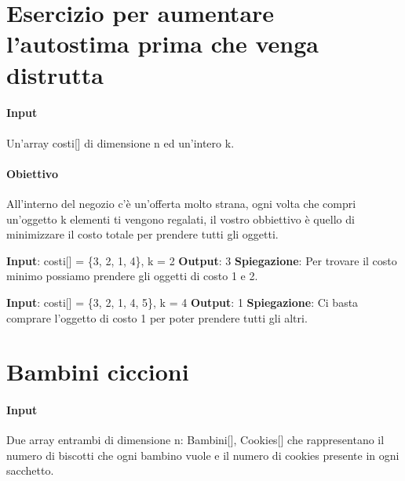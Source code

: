\setlength{\parskip}{0pt}
\titlespacing*{\subparagraph}{1em}{0em}{0em} 


\thispagestyle{chapterInit}
\section*{Esercizio per aumentare l'autostima prima che venga distrutta}
    \paragraph{Input} Un'array costi[] di dimensione n ed un'intero k.
    \paragraph{Obiettivo} All'interno del negozio c'è un'offerta molto strana, ogni volta che compri un'oggetto k elementi ti vengono regalati, il vostro obbiettivo è quello di minimizzare il costo totale per prendere tutti gli oggetti.
    \begin{esempio}
        \newline
        \textbf{Input}: costi[] = \{3, 2, 1, 4\}, k = 2
        \newline
        \textbf{Output}: 3
        \newline
        \textbf{Spiegazione}: Per trovare il costo minimo possiamo prendere gli oggetti di costo 1 e 2.
    \end{esempio}
    \begin{esempio}
        \newline
        \textbf{Input}: costi[] = \{3, 2, 1, 4, 5\}, k = 4
        \newline
        \textbf{Output}: 1
        \newline
        \textbf{Spiegazione}: Ci basta comprare l'oggetto di costo 1 per poter prendere tutti gli altri.
    \end{esempio}

\newpage
\thispagestyle{chapterInit}
\section*{Bambini ciccioni}
    \paragraph{Input} Due array entrambi di dimensione n: Bambini[], Cookies[] che rappresentano il numero di biscotti che ogni bambino vuole e il numero di cookies presente in ogni sacchetto.

